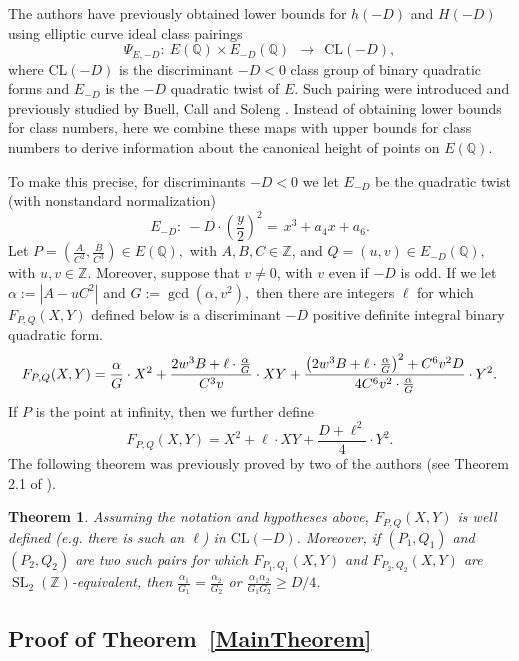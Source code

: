 \documentclass[12pt]{amsart}
\newtheorem{theorem}{Theorem}[section]
\newcommand{\CL}{\mathrm{CL}}
\newcommand{\Z}{\mathbb{Z}}
\newcommand{\Q}{\mathbb{Q}}
\newcommand{\SL}{\operatorname{SL}}
\numberwithin{equation}{section}
\begin{document}
The authors have previously \cite{GO1, GOT} obtained   lower bounds for $h(-D)$ and $H(-D)$ using
elliptic curve ideal class pairings
\begin{equation}\label{pairing}
\Psi_{E,-D}:\ E(\Q)\times E_{-D}(\Q) \ \ \longrightarrow\ \  \CL(-D),
\end{equation}
where $\CL(-D)$ is the discriminant $-D<0$ class group of binary quadratic forms and $E_{-D}$ is the $-D$ quadratic twist of $E$.
Such pairing were introduced and previously studied by Buell, Call and Soleng \cite{Buell, BuellCall, Soleng}.
Instead of obtaining lower bounds for class numbers, here we combine these maps with upper bounds for class numbers
to derive information about the canonical height of points on $E(\Q)$.

To make this precise, for discriminants
$-D<0$ we let $E_{-D}$ be the quadratic twist (with nonstandard normalization)
$$
E_{-D}: \  -D\cdot \left (\frac{y}{2}\right )^2=\, x^3 +a_4x+a_6.
$$
Let $P=(\tfrac{A}{C^2},\tfrac{B}{C^3})\in E(\Q),$ with $A, B, C\in \Z$, and $Q=(u,v)\in E_{-D}(\Q),$
with $u,v\in \Z$. Moreover, suppose that
 $v\neq 0$, with $v$ even if $-D$ is odd.
If we let $\alpha:=|A-u C^2|$ and  $G:=\gcd(\alpha, v^2),$ then there are integers $\ell$
for which $F_{P,Q}(X,Y)$ defined below is a discriminant $-D$ positive definite integral binary quadratic form. 
\begin{equation}\label{formula}
{\color{black}
F_{P,Q}(X,Y)=\frac{\alpha}{G} \cdot X^2+\frac{2w^3 B+\ell  \cdot \tfrac{\alpha}{G}}{C^3v}\cdot XY +\frac{\left({ 2w^3B+
\ell \cdot \tfrac{\alpha}{G}}\right)^2+C^6 v^2{D}}{4C^6v^2\cdot \frac{\alpha}{G}}\cdot Y^2.
}
\end{equation}
If $P$ is the point at infinity, then we further define 
\[
F_{P,Q}(X,Y)= X^2+\ell\cdot XY +\frac{D+\ell^2}{4}\cdot Y^2.
\]
The following theorem was previously proved by two of the authors (see Theorem 2.1 of \cite{GO1}).

\begin{theorem}\label{ThmQF}{}
Assuming the notation and hypotheses above, $F_{P,Q}(X,Y)$ is well defined (e.g. there is such an $\ell$)  {\color{black} in $\CL(-D)$}.
Moreover, if $(P_1,Q_1)$ and $(P_2, Q_2)$ are two such pairs for which $F_{P_1,Q_1}(X,Y)$ and $F_{P_2,Q_2}(X,Y)$ are $\SL_2(\Z)$-equivalent, then $\frac{\alpha_1}{G_1}=\frac{\alpha_2}{G_2}$ or $\frac{\alpha_1\alpha_2}{G_1G_2}\geq D/4$.
\end{theorem}

\subsection{Proof of Theorem~\ref{MainTheorem}}
\end{document}
